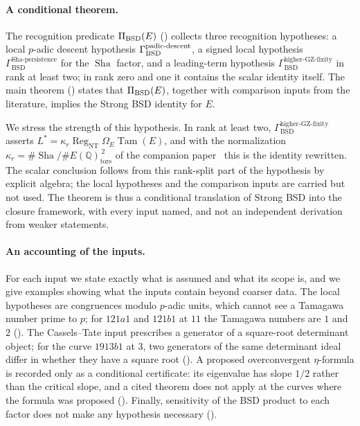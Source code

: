 \documentclass[11pt]{article}
\theoremstyle{definition}
\newcommand{\Q}{\mathbb{Q}}
\newcommand{\Sha}{\operatorname{Sha}}
\newcommand{\Reg}{\operatorname{Reg}}
\newcommand{\Tam}{\operatorname{Tam}}
\newcommand{\tors}{\operatorname{tors}}
\newcommand{\kapr}{\kappa_r}
\newcommand{\GammaSP}{\Gamma_{\mathrm{BSD}}^{\mathrm{Sha\text{-}persistence}}}
\newcommand{\GammaGZ}{\Gamma_{\mathrm{BSD}}^{\mathrm{higher\text{-}GZ\text{-}fixity}}}
\begin{document}
\paragraph{A conditional theorem.}
The recognition predicate $\Pi_{\mathrm{BSD}}(E)$ ()
collects three recognition hypotheses: a local $p$-adic descent
hypothesis $\Gamma_{\mathrm{BSD}}^{\mathrm{padic\text{-}descent}}$, a signed local hypothesis $\GammaSP$ for the
$\Sha$ factor, and a leading-term hypothesis $\GammaGZ$ in rank at least
two; in rank zero and one it contains the scalar identity itself.  The
main theorem () states that
$\Pi_{\mathrm{BSD}}(E)$, together with comparison inputs from the literature, implies
the Strong BSD identity for $E$.

We stress the strength of this hypothesis.  In rank at least two,
$\GammaGZ$ asserts $L^*=\kapr\Reg_{\mathrm{NT}}\Omega_E\Tam(E)$, and with
the normalization $\kapr=\#\Sha/\#E(\Q)_{\tors}^{\,2}$ of the companion
paper~\citep{TsiokosBSDApparatus2026} this is the identity rewritten.  The
scalar conclusion follows from this rank-split part of the hypothesis by
explicit algebra; the local hypotheses and the comparison inputs are
carried but not used.  The theorem is thus a conditional translation of
Strong BSD into the closure framework, with every input named, and not
an independent derivation from weaker statements.

\paragraph{An accounting of the inputs.}
For each input we state exactly what is assumed and what its scope is,
and we give examples showing what the inputs contain beyond coarser data.
The local hypotheses are congruences modulo $p$-adic units, which cannot
see a Tamagawa number prime to $p$; for $121a1$ and $121b1$ at $11$ the
Tamagawa numbers are $1$ and $2$ ().  The
Cassels--Tate input prescribes a generator of a square-root determinant
object; for the curve $1913b1$ at $3$, two generators of the same
determinant ideal differ in whether they have a square root
().  A proposed overconvergent $\eta$-formula is
recorded only as a conditional certificate: its eigenvalue has slope
$1/2$ rather than the critical slope, and a cited theorem does not apply
at the curves where the formula was proposed ().
Finally, sensitivity of the BSD product to each factor does not make any
hypothesis necessary ().
\end{document}
